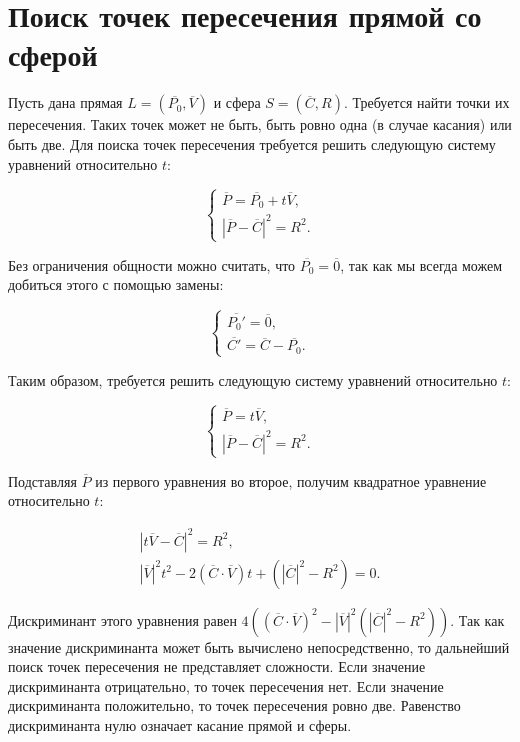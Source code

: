 \documentclass[a4paper,10pt]{extarticle}                     %
\numberwithin{equation}{section}                             %
\numberwithin{figure}{section}                               %
\theoremstyle{plain}                                         %
\begin{document}
\section{Поиск точек пересечения прямой со сферой}

Пусть дана прямая $L = (\overline{P_0}, \overline{V})$ и сфера $S = (\overline{C}, R)$.
Требуется найти точки их пересечения.
Таких точек может не быть, быть ровно одна (в случае касания) или быть две.
Для поиска точек пересечения требуется решить следующую систему уравнений относительно $t$:

\begin{equation}
    \begin{cases}
        \overline{P} = \overline{P_0} + t\overline{V}, \\
        {|\overline{P} - \overline{C}|}^2 = R^2.
    \end{cases}
\end{equation}

Без ограничения общности можно считать, что $\overline{P_0} = \overline{0}$, так как мы всегда можем добиться этого с помощью замены:

\begin{equation}
    \begin{cases}
        \overline{P_0'} = \overline{0}, \\
        \overline{C'} = \overline{C} - \overline{P_0}.
    \end{cases}
\end{equation}

Таким образом, требуется решить следующую систему уравнений относительно $t$:

\begin{equation}
    \begin{cases}
        \overline{P} = t\overline{V}, \\
        {|\overline{P} - \overline{C}|}^2 = R^2.
    \end{cases}
\end{equation}

Подставляя $\overline{P}$ из первого уравнения во второе, получим квадратное уравнение относительно $t$:

\begin{eqnarray}
    {|t\overline{V} - \overline{C}|}^2 = R^2, \\
    {|\overline{V}|}^2t^2 - 2(\overline{C}\cdot\overline{V})t + ({|\overline{C}|}^2 - R^2) = 0.
\end{eqnarray}

Дискриминант этого уравнения равен $4\left((\overline{C}\cdot\overline{V})^2 - {|\overline{V}|}^2({|\overline{C}|}^2 - R^2)\right)$.
Так как значение дискриминанта может быть вычислено непосредственно, то дальнейший поиск точек пересечения не представляет сложности.
Если значение дискриминанта отрицательно, то точек пересечения нет.
Если значение дискриминанта положительно, то точек пересечения ровно две.
Равенство дискриминанта нулю означает касание прямой и сферы.
\end{document}
